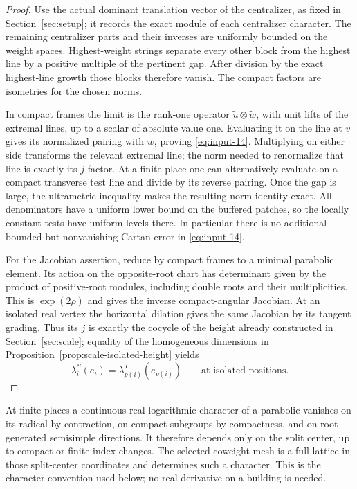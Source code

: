 \begin{proof}
Use the actual dominant translation vector of the centralizer, as fixed in
Section~\ref{sec:setup}; it records the exact module of each centralizer
character.  The remaining centralizer parts and their inverses are uniformly
bounded on the weight spaces.  Highest-weight strings separate every other
block from the highest line by a positive multiple of the pertinent gap.
After division by the exact highest-line growth those blocks therefore
vanish.  The compact factors are isometries for the chosen norms.

In compact frames the limit is the rank-one operator
$\widetilde u\otimes\widetilde w$, with unit lifts of the extremal lines,
up to a scalar of absolute value one.  Evaluating it on the line at $v$
gives its normalized pairing with $w$, proving
\eqref{eq:input-14}.  Multiplying on either side transforms the relevant
extremal line; the norm needed to renormalize that line is exactly its
$j$-factor.  At a finite place one can alternatively evaluate on a compact
transverse test line and divide by its reverse pairing.  Once the gap is
large, the ultrametric inequality makes the resulting norm identity exact.
All denominators have a uniform lower bound on the buffered patches, so the
locally constant tests have uniform levels there.  In particular there is
no additional bounded but nonvanishing Cartan error in
\eqref{eq:input-14}.

For the Jacobian assertion, reduce by compact frames to a minimal parabolic
element.  Its action on the opposite-root chart has determinant given by
the product of positive-root modules, including double roots and their
multiplicities.  This is $\exp(2\rho)$ and gives the inverse compact-angular
Jacobian.  At an isolated real vertex the horizontal dilation gives the same
Jacobian by its tangent grading.  Thus its $j$ is exactly the cocycle of the
height already constructed in Section~\ref{sec:scale}; equality of the
homogeneous dimensions in Proposition~\ref{prop:scale-isolated-height} yields
\[
 \lambda_i^S(e_i)=\lambda_{p(i)}^T(e_{p(i)})
 \qquad\text{at isolated positions}.
\]
\end{proof}

At finite places a continuous real logarithmic character of a parabolic
vanishes on its radical by contraction, on compact subgroups by compactness,
and on root-generated semisimple directions.  It therefore depends only on
the split center, up to compact or finite-index changes.  The selected
coweight mesh is a full lattice in those split-center coordinates and
determines such a character.  This is the character convention used below;
no real derivative on a building is needed.

